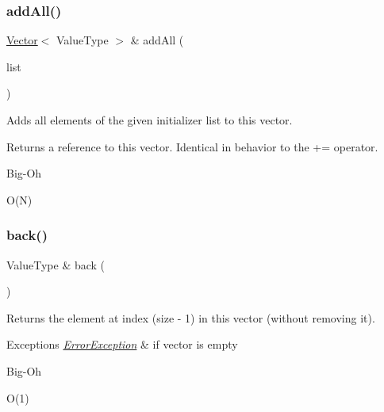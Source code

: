 \subsubsection{\texorpdfstring{add\+All()}{addAll()}\hspace{0.1cm}{\footnotesize\ttfamily [2/2]}}
{\footnotesize\ttfamily \mbox{\hyperlink{classVector}{Vector}}$<$ Value\+Type $>$ \& add\+All (\begin{DoxyParamCaption}\item[{std\+::initializer\+\_\+list$<$ Value\+Type $>$}]{list }\end{DoxyParamCaption})}



Adds all elements of the given initializer list to this vector. 

Returns a reference to this vector. Identical in behavior to the += operator. \begin{DoxyRefDesc}{Big-\/\+Oh}
\item[\mbox{\hyperlink{BigOh__BigOh000105}{Big-\/\+Oh}}]O(\+N) \end{DoxyRefDesc}
\mbox{\label{classVector_a2bad145b40a82c36986f67610313658d}} 
\subsubsection{\texorpdfstring{back()}{back()}\hspace{0.1cm}{\footnotesize\ttfamily [1/2]}}
{\footnotesize\ttfamily Value\+Type \& back (\begin{DoxyParamCaption}{ }\end{DoxyParamCaption})}



Returns the element at index (size -\/ 1) in this vector (without removing it). 


\begin{DoxyExceptions}{Exceptions}
{\em \mbox{\hyperlink{classErrorException}{Error\+Exception}}} & if vector is empty \\
\hline
\end{DoxyExceptions}
\begin{DoxyRefDesc}{Big-\/\+Oh}
\item[\mbox{\hyperlink{BigOh__BigOh000106}{Big-\/\+Oh}}]O(1) \end{DoxyRefDesc}
\mbox{\label{classVector_adc761c91bdacd01bed5c96e25fd9486a}} 
